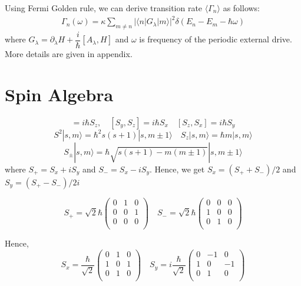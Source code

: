 \documentclass[11pt,a4paper]{article}
\begin{document}
Using Fermi Golden rule, we can derive transition rate $\langle \Gamma_n \rangle$ \cite{kolodrubetz2016geometry} as follows: 
\begin{align}
 \Gamma_n (\omega) = \kappa  \sum_{m \neq n} |\langle n | G_{\lambda} | m \rangle |^2 \delta(E_n-E_m- \hbar \omega)
\end{align}
where $G_{\lambda}= \partial_{\lambda} H + \dfrac{i}{\hbar} [A_{\lambda}, H]$ and  $\omega$ is frequency of the periodic external drive. More details are given in appendix.


\appendix

\section{Spin Algebra}\label{sec.spin_alegbra}
\begin{equation}
[S_x, S_y]=i \hbar S_z, \quad [S_y, S_z]=i \hbar S_x \quad [S_z, S_x]=i \hbar S_y
\end{equation}
\begin{equation}
S^2|s ,m \rangle = \hbar^2 s(s+1)|s ,m\pm 1\rangle  \quad S_z|s ,m \rangle = \hbar m |s ,m \rangle
\end{equation}
\begin{equation}
S_{\pm}|s, m\rangle = \hbar\sqrt{s(s+1)-m(m \pm 1)}|s,m \pm 1\rangle
\end{equation}
where $S_+ = S_x + iS_y$ and $S_- = S_x - iS_y $. Hence, we get $S_x = (S_+ + S_-)/2$ and $S_y = (S_+ - S_-)/2i $

\begin{equation}
S_+= \sqrt{2} \hbar\begin{pmatrix}
0 & 1 & 0\\
0 & 0 & 1\\
0 & 0 & 0\\
\end{pmatrix}
\quad
S_-=\sqrt{2} \hbar 
\begin{pmatrix}
0 & 0 & 0\\
1 & 0 & 0\\
0 & 1 & 0\\
\end{pmatrix}
\end{equation}

Hence,
\begin{equation}
S_x= \frac{\hbar}{\sqrt{2} }
\begin{pmatrix}
0 & 1 & 0\\
1 & 0 & 1\\
0 & 1 & 0\\
\end{pmatrix} \quad
S_y=  i \frac{\hbar}{\sqrt{2} }
\begin{pmatrix}
0 & -1 & 0\\
1 & 0 & -1\\
0 & 1 & 0\\
\end{pmatrix}
\end{equation}
\end{document}
